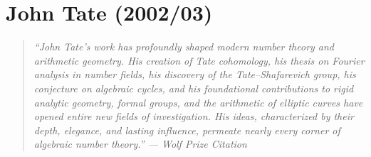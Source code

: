 \let\R\relax
\newcommand{\R}{\mathbb{R}}
\let\N\relax
\newcommand{\N}{\mathbb{N}}
\let\Z\relax
\newcommand{\Z}{\mathbb{Z}}
\let\Q\relax
\newcommand{\Q}{\mathbb{Q}}
\let\A\relax
\newcommand{\A}{\mathbb{A}}
\let\F\relax
\newcommand{\F}{\mathbb{F}}
\let\C\relax
\newcommand{\C}{\mathbb{C}}
\let\G\relax
\newcommand{\G}{\mathbb{G}}
\let\Gal\relax
\newcommand{\Gal}{\operatorname{Gal}}
\let\Spec\relax
\newcommand{\Spec}{\operatorname{Spec}}
\let\Hom\relax
\newcommand{\Hom}{\operatorname{Hom}}
\let\Ext\relax
\newcommand{\Ext}{\operatorname{Ext}}
\let\Tor\relax
\newcommand{\Tor}{\operatorname{Tor}}
\let\Frob\relax
\newcommand{\Frob}{\operatorname{Frob}}
\let\Cor\relax
\newcommand{\Cor}{\operatorname{Cor}}
\let\Inf\relax
\newcommand{\Inf}{\operatorname{Inf}}
\let\Ver\relax
\newcommand{\Ver}{\operatorname{Ver}}
\let\Def\relax
\newcommand{\Def}{\operatorname{Def}}
\let\Sel\relax
\newcommand{\Sel}{\operatorname{Sel}}
\let\Br\relax
\newcommand{\Br}{\operatorname{Br}}
\let\Pic\relax
\newcommand{\Pic}{\operatorname{Pic}}
\let\End\relax
\newcommand{\End}{\operatorname{End}}
\let\Aut\relax
\newcommand{\Aut}{\operatorname{Aut}}
\let\ord\relax
\newcommand{\ord}{\operatorname{ord}}
\let\coker\relax
\newcommand{\coker}{\operatorname{coker}}
\let\Ann\relax
\newcommand{\Ann}{\operatorname{Ann}}
\let\LT\relax
\newcommand{\LT}{\operatorname{LT}}
\let\rig\relax
\newcommand{\rig}{\operatorname{rig}}
\let\an\relax
\newcommand{\an}{\operatorname{an}}
\let\Sp\relax
\newcommand{\Sp}{\operatorname{Sp}}
\let\SU\relax
\newcommand{\SU}{\operatorname{SU}}
\let\NS\relax
\newcommand{\NS}{\operatorname{NS}}
\let\GL\relax
\newcommand{\GL}{\operatorname{GL}}
\let\Ind\relax
\newcommand{\Ind}{\operatorname{Ind}}
\let\ST\relax
\newcommand{\ST}{\operatorname{ST}}
\let\Sym\relax
\newcommand{\Sym}{\operatorname{Sym}}
\let\vol\relax
\newcommand{\vol}{\operatorname{vol}}
\let\inv\relax
\newcommand{\inv}{\operatorname{inv}}
\let\ab\relax
\newcommand{\ab}{\mathrm{ab}}

\chapter{John Tate (2002/03)}

\begin{quote}
\it ``John Tate's work has profoundly shaped modern number theory and arithmetic geometry. His creation of Tate cohomology, his thesis on Fourier analysis in number fields, his discovery of the Tate--Shafarevich group, his conjecture on algebraic cycles, and his foundational contributions to rigid analytic geometry, formal groups, and the arithmetic of elliptic curves have opened entire new fields of investigation. His ideas, characterized by their depth, elegance, and lasting influence, permeate nearly every corner of algebraic number theory.'' --- Wolf Prize Citation
\end{quote}


